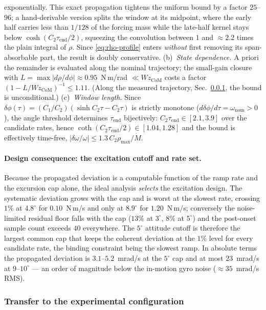 exponentially. This exact propagation tightens the uniform bound by a
factor $25$--$96$; a hand-derivable version splits the window at its
midpoint, where the early half carries less than $1/128$ of the
forcing mass while the late-half kernel stays below
$\cosh(C_2\tau_{\mathrm{end}}/2)$, squeezing the convolution between
$1$ and ${\approx}2.2$ times the plain integral of $\rho$. Since
\eqref{eq:rho-profile} enters \emph{without} first removing its
span-absorbable part, the result is doubly conservative.
(b)~\emph{State dependence.} A priori the remainder is evaluated along
the nominal trajectory; the small-gain closure with
$L = \max|d\rho/d\phi| \approx 0.95$~N\,m/rad
$\ll W z_{\mathrm{CoM}}$ costs a factor
$(1-L/Wz_{\mathrm{CoM}})^{-1} \le 1.11$. (Along the measured
trajectory, Sec.~\ref{sec:fid-transfer}, the bound is unconditional.)
(c)~\emph{Window length.} Since
$\delta\phi(\tau) = (C_1/C_2)(\sinh C_2\tau - C_2\tau)$ is strictly
monotone ($d\delta\phi/d\tau = \omega_{\mathrm{nom}} > 0$), the angle
threshold determines $\tau_{\mathrm{end}}$ bijectively:
$C_2\tau_{\mathrm{end}} \in [2.1,3.9]$ over the candidate rates, hence
$\coth(C_2\tau_{\mathrm{end}}/2) \in [1.04,1.28]$ and the bound is
effectively time-free,
$|\delta\omega/\omega| \le 1.3\,C_2\rho_{\max}/\dot M$.

\paragraph{Design consequence: the excitation cutoff and rate set.}
Because the propagated deviation is a computable function of the ramp
rate and the excursion cap alone, the ideal analysis \emph{selects}
the excitation design. The systematic deviation grows with the cap and
is worst at the slowest rate, crossing $1\%$ at $4.8^\circ$ for
$0.10$~N\,m/s and only at $8.9^\circ$ for $1.20$~N\,m/s; conversely
the noise-limited residual floor falls with the cap ($13\%$ at
$3^\circ$, $8\%$ at $5^\circ$) and the post-onset sample count exceeds
$40$ everywhere. The $5^\circ$ attitude cutoff is therefore the
largest common cap that keeps the coherent deviation at the $1\%$
level for every candidate rate, the binding constraint being the
slowest ramp. In absolute terms the propagated deviation is
$3.1$--$5.2$~mrad/s at the $5^\circ$ cap and at most $23$~mrad/s at
$9$--$10^\circ$ — an order of magnitude below the in-motion gyro noise
($\approx 35$~mrad/s RMS).

\subsubsection{Transfer to the experimental configuration}
\label{sec:fid-transfer}

